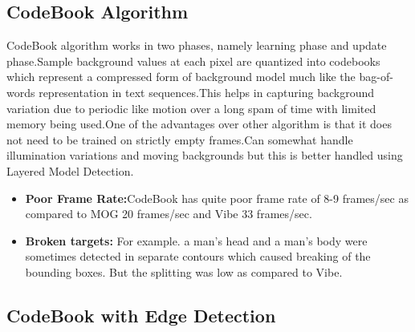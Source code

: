 \documentclass[12pt,a4paper]{report}
\begin{document}
\subsection*{CodeBook Algorithm}
CodeBook algorithm works in two phases, namely learning phase and update phase.Sample background values at each pixel are quantized into codebooks which represent a compressed form of background model much like the bag-of-words representation in text sequences.This helps in capturing background variation due to periodic like motion over a long spam of time with limited memory being used.One of the advantages over other algorithm is that it does not need to be trained on strictly empty frames.Can somewhat handle illumination variations and moving backgrounds but this is better handled using Layered Model Detection.
\begin{itemize}
\item {\bf Poor Frame Rate:}CodeBook has quite poor frame rate of 8-9 frames/sec as compared to MOG 20 frames/sec and Vibe
33 frames/sec. 
\item {\bf Broken targets:} For example. a man's head and a man's body were sometimes detected in separate contours which caused breaking of the bounding boxes. But the splitting was low as compared to Vibe.
\end{itemize} 

\subsection*{CodeBook with Edge Detection}
\end{document}
